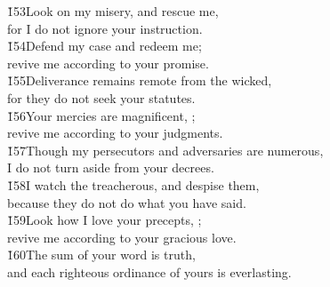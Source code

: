 \begin{poetry}
\poeml \v{153}Look on my misery, and rescue me, \\
\poemll    for I do not ignore your instruction. \\
\poeml \v{154}Defend my case and redeem me; \\
\poemll    revive me according to your promise. \\
\poeml \v{155}Deliverance remains remote from the wicked, \\
\poemll    for they do not seek your statutes. \\
\poeml \v{156}Your mercies are magnificent, ; \\
\poemll    revive me according to your judgments. \\
\poeml \v{157}Though my persecutors and adversaries are numerous, \\
\poemll    I do not turn aside from your decrees. \\
\poeml \v{158}I watch the treacherous, and despise them, \\
\poemll    because they do not do what you have said. \\
\poeml \v{159}Look how I love your precepts, ; \\
\poemll    revive me according to your gracious love. \\
\poeml \v{160}The sum of your word is truth, \\
\poemll    and each righteous ordinance of yours is everlasting.
\end{poetry}

